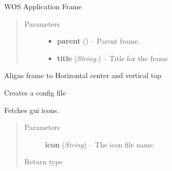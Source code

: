 \documentclass[letterpaper,10pt,english]{sphinxmanual}
\begin{document}
\begin{fulllineitems}
\label{api:wos.GUI}
WOS Application Frame
\begin{quote}\begin{description}
\item[{Parameters}] \leavevmode\begin{itemize}
\item {} 
\textbf{parent} () -- Parent frame.

\item {} 
\textbf{title} (\emph{String.}) -- Title for the frame

\end{itemize}

\end{description}\end{quote}

\begin{fulllineitems}
\label{api:wos.GUI.AlignCenterTop}
Aligns frame to Horizontal center and vertical top

\end{fulllineitems}


\begin{fulllineitems}
\label{api:wos.GUI.CreateConfig}
Creates a config file

\end{fulllineitems}


\begin{fulllineitems}
\label{api:wos.GUI.GetIcon}
Fetches gui icons.
\begin{quote}\begin{description}
\item[{Parameters}] \leavevmode
\textbf{icon} (\emph{String}) -- The icon file name.

\item[{Return type}] \leavevmode
{}

\end{description}\end{quote}

\end{fulllineitems}


\end{fulllineitems}
\end{document}
